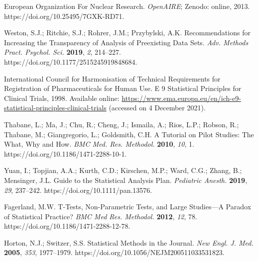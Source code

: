 \documentclass[psych,tutorial,accept,moreauthors,pdftex]{Definitions/mdpi}
\begin{document}
\begin{thebibliography}{999}
European Organization For Nuclear Research. \emph{OpenAIRE}; {Zenodo}: online, 2013. https://doi.org/10.25495/7GXK-RD71.%

Weston, S.J.; Ritchie, S.J.; Rohrer, J.M.; Przybylski, A.K. Recommendations for Increasing the Transparency of Analysis of Preexisting Data Sets. \emph{Adv. Methods Pract. Psychol. Sci.} \textbf{2019}, \emph{2}, 214--227. https://doi.org/10.1177/2515245919848684.


International Council for Harmonisation of Technical Requirements for Registration of Pharmaceuticals for Human Use. E 9 Statistical Principles for Clinical Trials, {1998.} Available online: \url{https://www.ema.europa.eu/en/ich-e9-statistical-principles-clinical-trials} (accessed on 4 December 2021). %


Thabane, L.; Ma, J.; Chu, R.; Cheng, J.; Ismaila, A.; Rios, L.P.; Robson, R.; Thabane, M.; Giangregorio, L.; Goldsmith, C.H. A Tutorial on Pilot Studies: The What, Why and How. \emph{BMC Med. Res. Methodol.} \textbf{2010}, \emph{10}, 1. https://doi.org/10.1186/1471-2288-10-1.


Yuan, I.; Topjian, A.A.; Kurth, C.D.; Kirschen, M.P.; Ward, C.G.; Zhang, B.; Mensinger, J.L. Guide to the Statistical Analysis Plan. \emph{Pediatric Anesth.} \textbf{2019}, \emph{29}, 237--242. https://doi.org/10.1111/pan.13576.


Fagerland, M.W. T-Tests, Non-Parametric Tests, and Large Studies—A Paradox of Statistical Practice? \emph{BMC Med Res. Methodol.} \textbf{2012}, \emph{12}, 78. https://doi.org/10.1186/1471-2288-12-78.


Horton, N.J.; Switzer, S.S. Statistical Methods in the Journal. \emph{New Engl. J. Med.} \textbf{2005}, \emph{353}, 1977--1979. https://doi.org/10.1056/\linebreak NEJM200511033531823.



\end{thebibliography}
\end{document}
